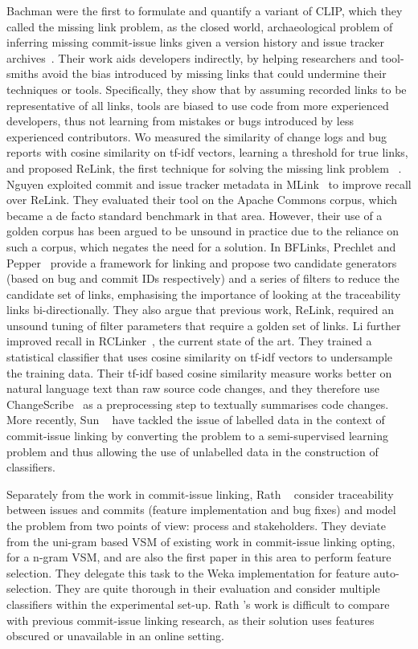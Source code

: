 Bachman \etal were the first to formulate and quantify a variant of CLIP, which
they called the missing link problem, as the closed world, archaeological
problem of inferring missing commit-issue links given a version history and
issue tracker archives~\cite{Bird2009,MissingLinks}. Their work aids developers
indirectly, by helping researchers and tool-smiths avoid the bias introduced by
missing links that could undermine their techniques or tools. Specifically, they
show that by assuming recorded links to be representative of all links, tools
are biased to use code from more experienced developers, thus not learning from
mistakes or bugs introduced by less experienced contributors. Wo \etal measured
the similarity of change logs and bug reports with cosine similarity on tf-idf
vectors, learning a threshold for true links, and proposed ReLink, the first
technique for solving the missing link problem ~\cite{relink}. Nguyen \etal
exploited commit and issue tracker metadata in MLink~\cite{MLink} to improve
recall over ReLink. They evaluated their tool on the Apache Commons corpus,
which became a de facto standard benchmark in that area. However, their use of a
golden corpus has been argued to be unsound in practice due to the reliance on
such a corpus, which negates the need for a solution. In BFLinks, Prechlet and
Pepper~\cite{Prechelt2014} provide a framework for linking and propose two
candidate generators (based on bug and commit IDs respectively) and a series of
filters to reduce the candidate set of links, emphasising the importance of
looking at the traceability links bi-directionally. They also argue that
previous work, ReLink, required an unsound tuning of filter parameters that
require a golden set of links. Li \etal further improved recall in
RCLinker~\cite{RCLinker}, the current state of the art. They trained a
statistical classifier that uses cosine similarity on tf-idf vectors to
undersample the training data.  Their tf-idf based cosine similarity measure
works better on natural language text than raw source code changes, and they
therefore use ChangeScribe~\cite{ChangeScribe} as a preprocessing step to
textually summarises code changes. More recently, Sun \etal~\cite{PULink} have
tackled the issue of labelled data in the context of commit-issue linking by
converting the problem to a semi-supervised learning problem and thus allowing
the use of unlabelled data in the construction of classifiers.

Separately from the work in commit-issue linking, Rath \etal~\cite{1804.02433}
consider traceability between issues and commits (feature implementation and bug
fixes) and model the problem from two points of view: process and stakeholders.
They deviate from the uni-gram based VSM of existing work in commit-issue
linking opting, for a n-gram VSM, and are also the first paper in this area to
perform feature selection. They delegate this task to the Weka implementation
for feature auto-selection. They are quite thorough in their evaluation and
consider multiple classifiers within the experimental set-up. Rath \etal's work
is difficult to compare with previous commit-issue linking research, as their
solution uses features obscured or unavailable in an online setting.

